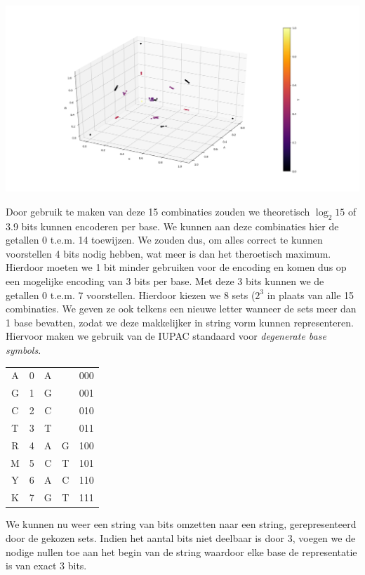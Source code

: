 \documentclass{esannV2}
\begin{document}
\includegraphics[scale=0.35]{img/theoretical.png}
\newpage

Door gebruik te maken van deze 15 combinaties zouden we theoretisch $\log_{2}{15}$ of 3.9 bits kunnen encoderen per base.
We kunnen aan deze combinaties hier de getallen 0 t.e.m. 14 toewijzen. We zouden dus, om alles correct te kunnen voorstellen 4 bits nodig hebben, wat meer is dan het theroetisch maximum. Hierdoor moeten we 1 bit minder gebruiken voor de encoding en komen dus op een mogelijke encoding van 3 bits per base.
Met deze 3 bits kunnen we de getallen 0 t.e.m. 7 voorstellen. Hierdoor kiezen we 8 sets ($2^{3}$ in plaats van alle 15 combinaties.
We geven ze ook telkens een nieuwe letter wanneer de sets meer dan 1 base bevatten, zodat we deze makkelijker in string vorm kunnen representeren. Hiervoor maken we gebruik van de IUPAC standaard voor \textit{degenerate base symbols}.

   
\begin{center}
\begin{tabular}{ c || c | c c |c}
	A & 0 & A && 000\\
	G & 1 & G && 001\\
	C & 2 & C && 010\\
	T & 3 & T && 011\\
	R & 4 & A & G& 100\\
	M & 5 & C & T& 101\\
	Y & 6 & A & C& 110\\
	K & 7 & G & T& 111\\
\end{tabular}
\end{center}

We kunnen nu weer een string van bits omzetten naar een string, gerepresenteerd door de gekozen sets. Indien het aantal bits niet deelbaar is door 3, voegen we de nodige nullen toe aan het begin van de string waardoor elke base de representatie is van exact 3 bits.
\end{document}
